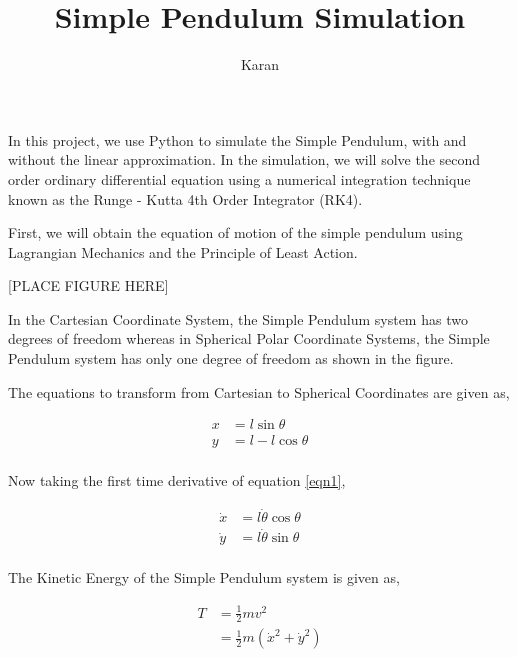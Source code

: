 \documentclass[12pt]{article}
\title{Simple Pendulum Simulation}
\author{Karan}
\begin{document}
\maketitle

In this project, we use Python to simulate the Simple Pendulum, with and without the linear approximation.
In the simulation, we will solve the second order ordinary differential equation using a numerical integration
technique known as the Runge - Kutta 4th Order Integrator (RK4). \newline

First, we will obtain the equation of motion of the simple pendulum using Lagrangian Mechanics and the Principle of Least
Action. \newline

[PLACE FIGURE HERE]

In the Cartesian Coordinate System, the Simple Pendulum system has two degrees of freedom whereas
in Spherical Polar Coordinate Systems, the Simple Pendulum system has only one degree of freedom as shown in the figure. \newline

The equations to transform from Cartesian to Spherical Coordinates are given as,

\begin{equation} \label{eqn1}
    \begin{split}
        x &= l\sin{\theta} \\
        y &= l - l\cos{\theta} \\
    \end{split}
\end{equation}

Now taking the first time derivative of equation \ref{eqn1},

\begin{equation} \label{eqn2}
    \begin{split}
        \dot{x} &= l \dot{\theta} \cos{\theta}  \\
        \dot{y} &= l \dot{\theta} \sin{\theta}  \\
    \end{split}
\end{equation}

The Kinetic Energy of the Simple Pendulum system is given as,

\begin{equation} \label{eqn3}
    \begin{split}
        T &= \frac{1}{2} m v^{2} \\
        &= \frac{1}{2} m ( \dot{x}^{2} + \dot{y}^{2} ) \\
    \end{split}
\end{equation}
\end{document}
